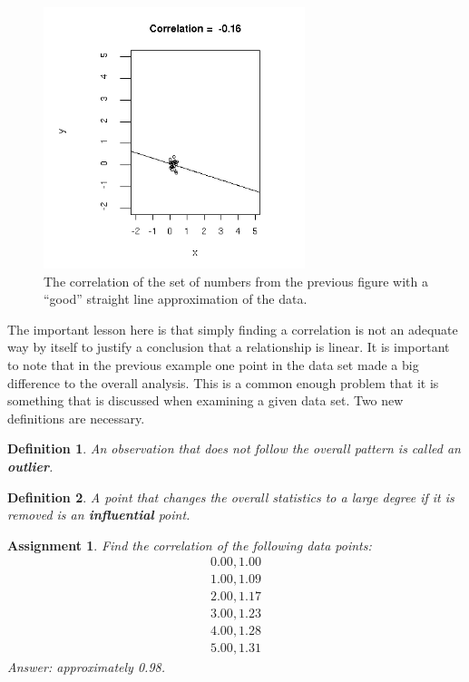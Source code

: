 \documentclass[12pt]{article}
\newtheorem{definition}{Definition}[section]
\newtheorem{assignment}{Assignment}[section]
\begin{document}
\begin{figure}[tb]
  \centerline{\includegraphics[height=3in]{correlation4}}
  \caption{The correlation of the set of numbers from the previous
    figure with a ``good'' straight line approximation of the data.}
  \label{fig:correlation4}
\end{figure}

The important lesson here is that simply finding a correlation is not
an adequate way by itself to justify a conclusion that a relationship
is linear. It is important to note that in the previous example one
point in the data set made a big difference to the overall analysis.
This is a common enough problem that it is something that is discussed
when examining a given data set. Two new definitions are necessary.

\begin{definition}
  An observation that does not follow the overall pattern is called an
  \textbf{outlier}.
\end{definition}

\begin{definition}
  A point that changes the overall statistics to a large degree if it
  is removed is an \textbf{influential} point.
\end{definition}

\begin{assignment}
  Find the correlation of the following data points:
  \begin{eqnarray*}
    0.00, 1.00 \\
    1.00, 1.09 \\
    2.00, 1.17 \\
    3.00, 1.23 \\
    4.00, 1.28 \\
    5.00, 1.31
  \end{eqnarray*}
\textit{Answer: approximately 0.98.}
\end{assignment}
\end{document}
